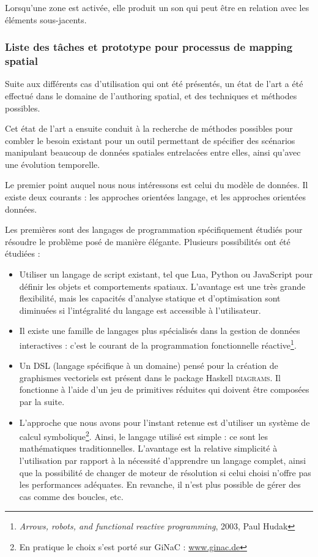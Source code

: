 \documentclass[french,12pt]{article}
\begin{document}
Lorsqu'une zone est activée, elle produit un son qui peut être en relation avec les éléments sous-jacents. %

\subsubsection{Liste des tâches et prototype pour processus de mapping spatial}
Suite aux différents cas d'utilisation qui ont été présentés, un état de l'art a été effectué dans le domaine de l'authoring spatial, et des techniques et méthodes possibles.

Cet état de l'art a ensuite conduit à la recherche de méthodes possibles pour combler le besoin existant pour un outil permettant de spécifier des scénarios manipulant beaucoup de données spatiales entrelacées entre elles, ainsi qu'avec une évolution temporelle.

Le premier point auquel nous nous intéressons est celui du modèle de données. Il existe deux courants : les approches orientées langage, et les approches orientées données. 

Les premières sont des langages de programmation spécifiquement étudiés pour résoudre le problème posé de manière élégante. Plusieurs possibilités ont été étudiées : 
\begin{itemize}
\item Utiliser un langage de script existant, tel que Lua, Python ou JavaScript pour définir les objets et comportements spatiaux. L'avantage est une très grande flexibilité, mais les capacités d'analyse statique et d'optimisation sont diminuées si l'intégralité du langage est accessible à l'utilisateur.
\item Il existe une famille de langages plus spécialisés dans la gestion de données interactives : c'est le courant de la programmation fonctionnelle réactive\footnote{\textit{Arrows, robots, and functional reactive programming}, 2003, Paul Hudak}.
\item Un DSL (langage spécifique à un domaine) pensé pour la création de graphismes vectoriels est présent dans le package Haskell \textsc{diagrams}. Il fonctionne à l'aide d'un jeu de primitives réduites qui doivent être composées par la suite.
\item L'approche que nous avons pour l'instant retenue est d'utiliser un système de calcul symbolique\footnote{En pratique le choix s'est porté sur GiNaC : \url{www.ginac.de}}. Ainsi, le langage utilisé est simple : ce sont les mathématiques traditionnelles. L'avantage est la relative simplicité à l'utilisation par rapport à la nécessité d'apprendre un langage complet, ainsi que la possibilité de changer de moteur de résolution si celui choisi n'offre pas les performances adéquates.
En revanche, il n'est plus possible de gérer des cas comme des boucles, etc.
\end{itemize}
\end{document}
